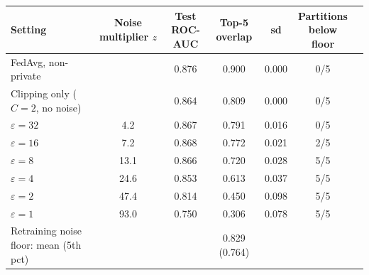 \begin{tabular}{lcccccc}
\toprule
Setting & \makecell{Noise\\multiplier $z$} & \makecell{Test\\ROC-AUC} & \makecell{Top-5\\overlap} & sd & \makecell{Partitions\\below floor} \\
\midrule
FedAvg, non-private &  & 0.876 & 0.900 & 0.000 & 0/5 \\
Clipping only ($C=2$, no noise) &  & 0.864 & 0.809 & 0.000 & 0/5 \\
$\varepsilon=32$ & 4.2 & 0.867 & 0.791 & 0.016 & 0/5 \\
$\varepsilon=16$ & 7.2 & 0.868 & 0.772 & 0.021 & 2/5 \\
$\varepsilon=8$ & 13.1 & 0.866 & 0.720 & 0.028 & 5/5 \\
$\varepsilon=4$ & 24.6 & 0.853 & 0.613 & 0.037 & 5/5 \\
$\varepsilon=2$ & 47.4 & 0.814 & 0.450 & 0.098 & 5/5 \\
$\varepsilon=1$ & 93.0 & 0.750 & 0.306 & 0.078 & 5/5 \\
Retraining noise floor: mean (5th pct) & & & 0.829 (0.764) & & \\
\bottomrule
\end{tabular}
